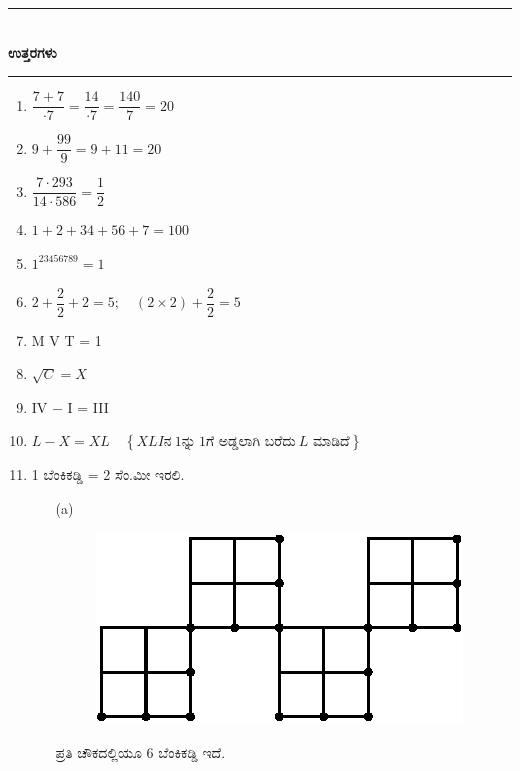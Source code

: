 \medskip

\begin{center}
\rule{5cm}{1pt}\\[3pt]
{\Large\bfseries ಉತ್ತರಗಳು}\\[-0.1cm]
\rule{5cm}{1pt}
\end{center}

\begin{enumerate}
\itemsep=5pt

\item $\dfrac{7+7}{\cdot 7} = \dfrac{14}{\cdot 7} = \dfrac{140}{7} = 20$

\item $9 + \dfrac{99}{9} = 9 + 11 = 20$

\item $\dfrac{7\cdot 293}{14\cdot 586} = \dfrac{1}{2}$

\item $1+2+34+56+7 = 100$

\item $1^{23456789} = 1$

\item $2 + \dfrac{2}{2} + 2 = 5;\quad (2 \times 2)  + \dfrac{2}{2} = 5$

\item M \qquad V T = 1

\item $\sqrt{C} = X$

\item IV $-$ I = III

\item $L - X = XL\quad \left\{XLI \text{ನ} ~1 \text{ನ್ನು} ~1 \text{ಗೆ ಅಡ್ಡಲಾಗಿ ಬರೆದು} ~L \text{ ಮಾಡಿದೆ} \right\}$


\item 1 ಬೆಂಕಿಕಡ್ಡಿ = 2 ಸೆಂ.ಮೀ ಇರಲಿ. 

\begin{itemize}
\item[(a)] 
~

\begin{minipage}[c]{5cm}
\begin{figure}[H]
\centering
\includegraphics{images/chap7/ans11a.eps}
\end{figure}
\end{minipage}
\begin{minipage}[c]{4cm}
ಪ್ರತಿ ಚೌಕದಲ್ಲಿಯೂ 6 ಬೆಂಕಿಕಡ್ಡಿ ಇದೆ. 


\end{minipage}
\end{itemize}
\end{enumerate}
